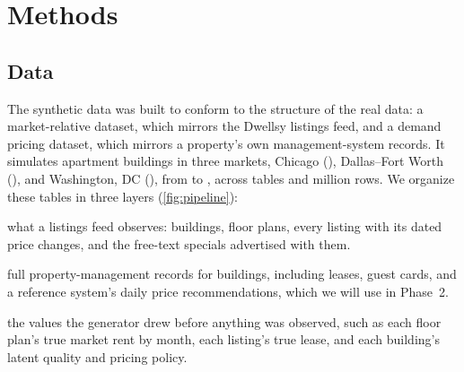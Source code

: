 \section{Methods}\label{sec:methods}


\subsection{Data}\label{sec:data}


The synthetic data was built to conform to the structure of the real data: a market-relative
dataset, which mirrors the Dwellsy listings feed, and a demand pricing dataset, which mirrors a
property's own management-system records. It simulates \nBuildings{} apartment buildings in three
markets, Chicago (\nChicago{}), Dallas--Fort Worth (\nDfw{}), and Washington, DC (\nDc{}), from
\historyStart{} to \asOf{}, across \nSourceTables{} tables and \nSourceRowsM{} million rows. We
organize these tables in three layers (\cref{fig:pipeline}):

\begin{description}[leftmargin=1.5em, labelindent=0pt, font=\normalfont\bfseries]
  \item[Market] what a listings feed observes: buildings, floor plans, every listing with its dated
  price changes, and the free-text specials advertised with them.
  \item[Operator] full property-management records for \nPms{} buildings, including leases, guest
  cards, and a reference system's daily price recommendations, which we will use in Phase~2.
  \item[Truth] the values the generator drew before anything was observed, such as each floor plan's
  true market rent by month, each listing's true lease, and each building's latent quality and
  pricing policy.
\end{description}

